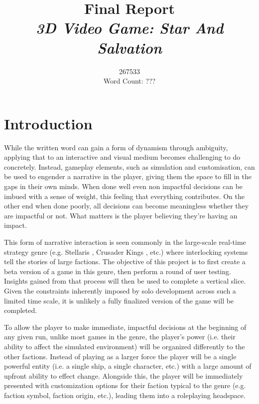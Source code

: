 \documentclass{report}
\begin{document}
\title{
Final Report \\ 
\textit{3D Video Game: Star And Salvation} }
\author{267533\\
\large Word Count: ???}

\maketitle

\tableofcontents

\chapter{Introduction}
While the written word can gain a form of dynamism through ambiguity, applying that to an interactive and visual medium becomes challenging to do concretely. Instead, gameplay elements, such as simulation and customisation, can be used to engender a narrative in the player, giving them the space to fill in the gaps in their own minds. When done well even non impactful decisions can be imbued with a sense of weight, this feeling that everything contributes. On the other end when done poorly, all decisions can become meaningless whether they are impactful or not. What matters is the player believing they're having an impact. 

This form of narrative interaction is seen commonly in the large-scale real-time strategy genre (e.g. Stellaris \cite{stellaris}, Crusader Kings \cite{crusaderkings}, etc.) where interlocking systems tell the stories of large factions. The objective of this project is to first create a beta version of a game in this genre, then perform a round of user testing. Insights gained from that process will then be used to complete a vertical slice. Given the constraints inherently imposed by solo development across such a limited time scale, it is unlikely a fully finalized version of the game will be completed.

To allow the player to make immediate, impactful decisions at the beginning of any given run, unlike most games in the genre, the player's power (i.e. their ability to affect the simulated environment) will be organized differently to the other factions. Instead of playing as a larger force the player will be a single powerful entity (i.e. a single ship, a single character, etc.) with a large amount of upfront ability to effect change. Alongside this, the player will be immediately presented with customization options for their faction typical to the genre (e.g. faction symbol, faction origin, etc.), leading them into a roleplaying headspace. 
\end{document}
